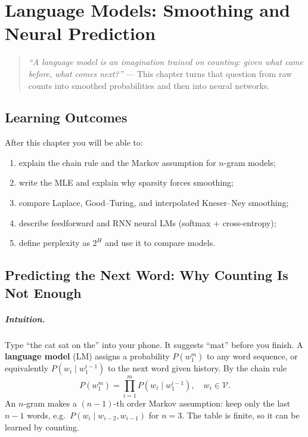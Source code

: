 \chapter{Language Models: Smoothing and Neural Prediction}\label{ch:language-model}
\begin{quote}
\emph{``A language model is an imagination trained on counting: given what came before, what comes next?''} --- This chapter turns that question from raw counts into smoothed probabilities and then into neural networks.
\end{quote}
\noindent{}
\vspace{0.3em}
\section*{Learning Outcomes}
After this chapter you will be able to:
\begin{enumerate}[label=(L\arabic*)]
    \item explain the chain rule and the Markov assumption for $n$-gram models;
    \item write the MLE and explain why sparsity forces smoothing;
    \item compare Laplace, Good--Turing, and interpolated Kneser--Ney smoothing;
    \item describe feedforward and RNN neural LMs (softmax + cross-entropy);
    \item define perplexity as $2^{H}$ and use it to compare models.
\end{enumerate}
\section{Predicting the Next Word: Why Counting Is Not Enough}\label{sec:next-word}
\paragraph{Intuition.} Type ``the cat sat on the'' into your phone. It suggests ``mat'' before you finish. A \textbf{language model} (LM) assigns a probability $P(w_{1}^{m})$ to any word sequence, or equivalently $P(w_{i}\mid w_{1}^{i-1})$ to the next word given history. By the chain rule
\begin{equation}
P(w_{1}^{m})=\prod_{i=1}^{m} P(w_{i}\mid w_{1}^{i-1}), \quad w_{i}\in\mathcal{V}.
\label{eq:chain}
\end{equation}
An $n$-gram makes a $(n-1)$-th order Markov assumption: keep only the last $n-1$ words, e.g.\ $P(w_{i}\mid w_{i-2},w_{i-1})$ for $n=3$. The table is finite, so it can be learned by counting.
